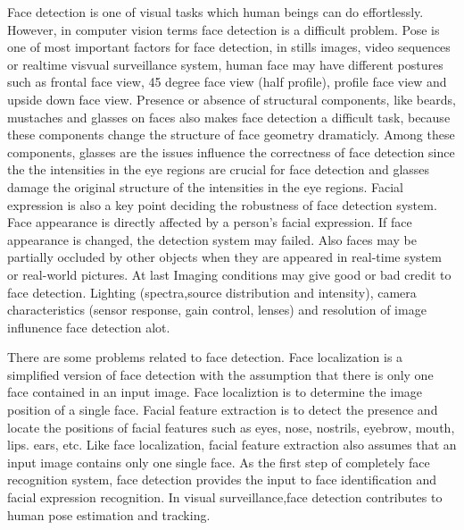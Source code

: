 Face detection is one of visual tasks which human beings can do effortlessly. However, in computer vision terms face detection is a difficult problem. Pose is one of most important factors for face detection, in stills images, video sequences or realtime visvual surveillance system, human face may have different postures such as frontal face view, 45 degree face view (half profile), profile face view and upside down face view. 
Presence or absence of structural components, like beards, mustaches and glasses on faces also makes face detection a difficult task, because these components change the structure of face geometry dramaticly. Among these components, glasses are the issues influence the correctness of face detection since the the intensities in the eye regions are crucial for face detection \cite{Viola2001} and glasses damage the original structure of the intensities in the eye regions. Facial expression is also a key point deciding the robustness of face detection system. Face appearance is directly affected by a person's facial expression. If face appearance is changed, the detection system may failed. Also faces may be partially occluded by other objects when they are appeared in real-time system or real-world pictures. At last Imaging conditions may give good or bad credit to face detection. Lighting (spectra,source distribution and intensity), camera characteristics (sensor response, gain control, lenses) and resolution of image influnence face detection alot.

There are some problems related to face detection. Face localization is a simplified version of face detection with the assumption that there is only one face contained in an input image. Face localiztion is to determine the image position of a single face. Facial feature extraction is to detect the presence and locate the positions of facial features such as eyes, nose, nostrils, eyebrow, mouth, lips. ears, etc. Like face localization, facial feature extraction also assumes that an input image contains only one single face. As the first step of completely face recognition system, face detection provides the input to face identification and facial expression recognition. In visual surveillance,face detection contributes to human pose estimation and tracking.


